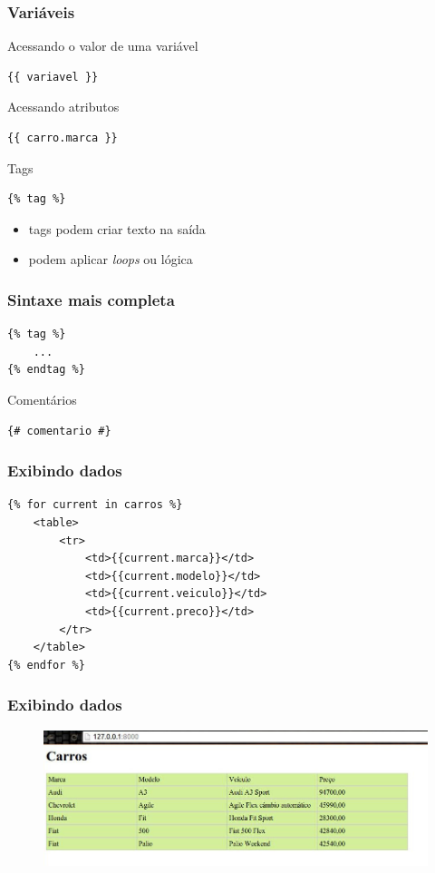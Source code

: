 \documentclass[aspectratio=169]{beamer}
\begin{document}
\begin{frame}[fragile]\frametitle{Vari\'aveis}
Acessando o valor de uma vari\'avel

\begin{verbatim}
{{ variavel }}
\end{verbatim}

Acessando atributos

\begin{verbatim}
{{ carro.marca }}
\end{verbatim}

Tags

\begin{verbatim}
{% tag %}
\end{verbatim}

\begin{itemize}
 	\item tags podem criar texto na sa\'ida
 	\item podem aplicar \emph{loops} ou l\'ogica
\end{itemize}

\end{frame}

\begin{frame}[fragile]\frametitle{Sintaxe mais completa}
\begin{verbatim}
{% tag %}
	...
{% endtag %}
\end{verbatim}

Coment\'arios

\begin{verbatim}
{# comentario #}
\end{verbatim}
\end{frame}


\begin{frame}[fragile]\frametitle{Exibindo dados}
	\begin{verbatim}
{% for current in carros %}
	<table>
		<tr>
			<td>{{current.marca}}</td>
			<td>{{current.modelo}}</td>
			<td>{{current.veiculo}}</td>
			<td>{{current.preco}}</td>
		</tr>
	</table>
{% endfor %}
	\end{verbatim}
\end{frame}

\begin{frame}\frametitle{Exibindo dados}
	\begin{figure}[h]
	  \centering
  		\includegraphics[height=.5\paperheight]{figuras/pagina}
	\end{figure}
\end{frame}
\end{document}
